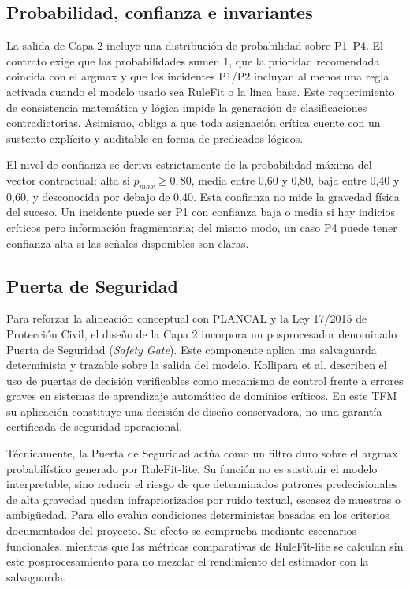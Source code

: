 \subsection{Probabilidad, confianza e invariantes}

La salida de Capa 2 incluye una distribución de probabilidad sobre P1--P4. El contrato exige que las probabilidades sumen 1, que la prioridad recomendada coincida con el argmax y que los incidentes P1/P2 incluyan al menos una regla activada cuando el modelo usado sea RuleFit o la línea base. Este requerimiento de consistencia matemática y lógica impide la generación de clasificaciones contradictorias. Asimismo, obliga a que toda asignación crítica cuente con un sustento explícito y auditable en forma de predicados lógicos.

El nivel de confianza se deriva estrictamente de la probabilidad máxima del vector contractual: alta si \(p_{max} \geq 0{,}80\), media entre 0,60 y 0,80, baja entre 0,40 y 0,60, y desconocida por debajo de 0,40. Esta confianza no mide la gravedad física del suceso. Un incidente puede ser P1 con confianza baja o media si hay indicios críticos pero información fragmentaria; del mismo modo, un caso P4 puede tener confianza alta si las señales disponibles son claras.

\subsection{Puerta de Seguridad}

Para reforzar la alineación conceptual con PLANCAL y la Ley 17/2015 de Protección Civil, el diseño de la Capa 2 incorpora un posprocesador denominado Puerta de Seguridad (\textit{Safety Gate}). Este componente aplica una salvaguarda determinista y trazable sobre la salida del modelo. Kollipara et al.  describen el uso de puertas de decisión verificables como mecanismo de control frente a errores graves en sistemas de aprendizaje automático de dominios críticos. En este TFM su aplicación constituye una decisión de diseño conservadora, no una garantía certificada de seguridad operacional.

Técnicamente, la Puerta de Seguridad actúa como un filtro duro sobre el argmax probabilístico generado por RuleFit-lite. Su función no es sustituir el modelo interpretable, sino reducir el riesgo de que determinados patrones predecisionales de alta gravedad queden infrapriorizados por ruido textual, escasez de muestras o ambigüedad. Para ello evalúa condiciones deterministas basadas en los criterios documentados del proyecto. Su efecto se comprueba mediante escenarios funcionales, mientras que las métricas comparativas de RuleFit-lite se calculan sin este posprocesamiento para no mezclar el rendimiento del estimador con la salvaguarda.

